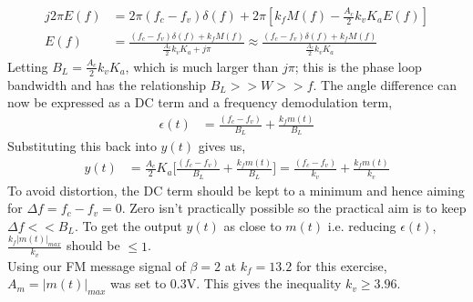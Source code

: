 \documentclass[11pt]{article}
\begin{document}
\begin{enumerate}[label=(\alph*)]
\begin{align*}
    j2\pi E(f) &= 2\pi(f_c - f_v)\delta(f) + 2\pi[k_f M(f) - \frac{A_c}{2} k_v K_a E(f)]\\
    E(f) &= \frac{(f_c - f_v)\delta(f) + k_f M(f)}{\frac{A_c}{2} k_v K_a + j\pi} \approx \frac{(f_c - f_v)\delta(f) + k_f M(f)}{\frac{A_c}{2} k_v K_a}
\end{align*}
Letting $B_L = \frac{A_c}{2} k_v K_a$, which is much larger than $j\pi$; this is the phase loop bandwidth and has the relationship $B_L >> W >> f$. The angle difference can now be expressed as a DC term and a frequency demodulation term, 
\begin{align*}
    \epsilon(t) &= \frac{(f_c - f_v)}{B_L} + \frac{k_f m(t)}{B_L}
\end{align*}
Substituting this back into $y(t)$ gives us, 
\begin{align*}
    y(t) &= \frac{A_c}{2} K_a \bigg[\frac{(f_c - f_v)}{B_L} + \frac{k_f m(t)}{B_L}\bigg] = \frac{(f_c - f_v)}{k_v} + \frac{k_f m(t)}{k_v}
\end{align*}
To avoid distortion, the DC term should be kept to a minimum and hence aiming for $\Delta f = f_c - f_v = 0$. Zero isn't practically possible so the practical aim is to keep $\Delta f << B_L$. To get the output $y(t)$ as close to $m(t)$ i.e. reducing $\epsilon(t)$, $\frac{k_f|m(t)|_{max}}{k_v}$ should be $\leq 1$.\\
Using our FM message signal of $\beta = 2$ at $k_f = 13.2$ for this exercise, $A_m = |m(t)|_{max}$ was set to 0.3V. This gives the inequality $k_v \geq 3.96$.






\end{enumerate}
\end{document}
